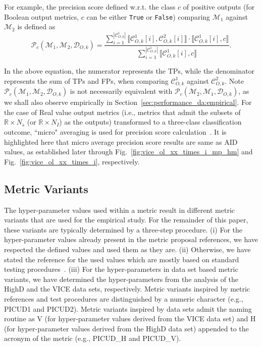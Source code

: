 \documentclass[journal]{IEEEtran}
\newcommand{\R}{\mathbb{R}}
\begin{document}
For example, the precision score defined w.r.t. the class $c$ of positive outputs (for Boolean output metrics, $c$ can be either \texttt{True} or \texttt{False}) comparing $\mathcal{M}_1$ against $\mathcal{M}_2$ is defined as
\begin{equation}\label{eq:precision_c}
    \mathcal{P}_c(\mathcal{M}_1, \mathcal{M}_2, \mathcal{D}_{O, k})\!=\!\frac{\sum_{i=1}^{|\mathcal{C}^1_{O, k}|}\llbracket \mathcal{C}^1_{O, k}[i],\mathcal{C}^2_{O, k}[i] \rrbracket\!\cdot\!\llbracket \mathcal{C}^1_{O, k}[i],c \rrbracket}{\sum_{i=1}^{|\mathcal{C}^1_{O, k}|}\llbracket \mathcal{C}^1_{O, k}[i],c \rrbracket}.
\end{equation}

In the above equation, the numerator represents the TPs, while the denominator represents the sum of TPs and FPs, when comparing $\mathcal{C}^1_{O, k}$ against $\mathcal{C}^2_{O, k}$. Note $\mathcal{P}_c(\mathcal{M}_1, \mathcal{M}_2, \mathcal{D}_{O, k})$ is not necessarily equivalent with $\mathcal{P}_c(\mathcal{M}_2, \mathcal{M}_1, \mathcal{D}_{O, k})$, as we shall also observe empirically in Section~\ref{sec:performance_da:empirical}. For the case of Real value output metrics (i.e., metrics that admit the subsets of $\R \times N_s$ (or $\R \times N_I$) as the outputs) transformed to a three-class classification outcome, ``micro" averaging is used for precision score calculation~\cite{grandini2020metrics}. It is highlighted here that micro average precision score results are same as AID values, as established later through Fig.~\ref{fig:vice_ol_xx_times_i_mp_hm} and Fig.~\ref{fig:vice_ol_xx_times_i}, respectively.

\subsection{Metric Variants} \label{sec:metric_variants}

The hyper-parameter values used within a metric result in different metric variants that are used for the empirical study. For the remainder of this paper, these variants are typically determined by a three-step procedure. (i) For the hyper-parameter values already present in the metric proposal references, we have respected the defined values and used them as they are. (ii) Otherwise, we have stated the reference for the used values which are mostly based on standard testing procedures~\cite{euro2017test}. (iii) For the hyper-parameters in data set based metric variants, we have determined the hyper-parameters from the analysis of the HighD and the VICE data sets, respectively. Metric variants inspired by metric references and test procedures are distinguished by a numeric character (e.g., PICUD1 and PICUD2). Metric variants inspired by data sets admit the naming routine as V (for hyper-parameter values derived from the VICE data set) and H (for hyper-parameter values derived from the HighD data set) appended to the acronym of the metric (e.g., PICUD\_H and PICUD\_V).
\end{document}

